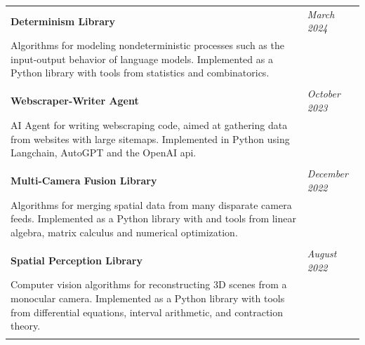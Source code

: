 \documentclass{article}
\begin{document}
\begin{tabular}{ m{6in} m{1in}}
\textbf{Determinism Library}  & \textit{March 2024} \\
Algorithms for modeling nondeterministic processes such as the input-output behavior of language models. Implemented as a Python library with tools from statistics and combinatorics.& \\ \\
\textbf{Webscraper-Writer Agent} & \textit{October 2023} \\
AI Agent for writing webscraping code, aimed at gathering data from websites with large sitemaps. Implemented in Python using Langchain, AutoGPT and the OpenAI api.
& \\  \\
\textbf{Multi-Camera Fusion Library} & \textit{December 2022} \\
Algorithms for merging spatial data from many disparate camera feeds.  Implemented as a Python library with and tools from linear algebra, matrix calculus and numerical optimization.
& \\  \\
\textbf{Spatial Perception Library} & \textit{August 2022} \\
Computer vision algorithms for reconstructing 3D scenes from a monocular camera. Implemented as a Python library with tools from differential equations, interval arithmetic, and contraction theory. & \\
    \\
\end{tabular}


\newpage
\end{document}
